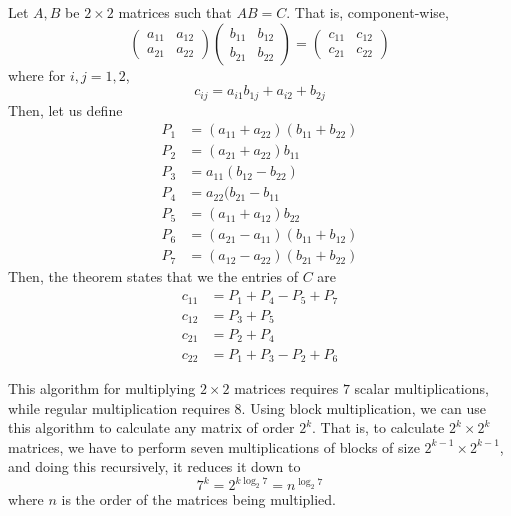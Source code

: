   \begin{theorem}
    Let $A, B$ be $2 \times 2$ matrices such that $AB = C$. That is, component-wise,
    \begin{equation}
      \begin{pmatrix}
      a_{11} & a_{12} \\ a_{21} & a_{22}
      \end{pmatrix} \begin{pmatrix}
      b_{11} & b_{12} \\ b_{21} & b_{22}
      \end{pmatrix}
       = \begin{pmatrix}
        c_{11} & c_{12} \\ c_{21} & c_{22}
       \end{pmatrix}
    \end{equation}
    where for $i, j = 1, 2$, 
    \begin{equation}
      c_{ij} = a_{i1} b_{1j} + a_{i2} + b_{2j}
    \end{equation}
    Then, let us define 
    \begin{align*}
      P_1 &= (a_{11} + a_{22}) (b_{11} + b_{22}) \\
      P_2 &= (a_{21} + a_{22}) b_{11} \\
      P_3 &= a_{11} (b_{12} - b_{22}) \\
      P_4 &= a_{22} (b_{21} - b_{11} \\
      P_5 &= (a_{11} + a_{12}) b_{22} \\
      P_6 &= (a_{21} - a_{11}) (b_{11} + b_{12}) \\
      P_7 &= (a_{12} - a_{22}) (b_{21} + b_{22}) 
    \end{align*}
    Then, the theorem states that we the entries of $C$ are 
    \begin{align*}
      c_{11} &= P_1 + P_4 - P_5 + P_7 \\
      c_{12} &= P_3 + P_5 \\
      c_{21} &= P_2 + P_4 \\
      c_{22} &= P_1 + P_3 - P_2 + P_6
    \end{align*}
  \end{theorem}

  This algorithm for multiplying $2\times 2$ matrices requires $7$ scalar multiplications, while regular multiplication requires $8$. Using block multiplication, we can use this algorithm to calculate any matrix of order $2^k$. That is, to calculate $2^k \times 2^k$ matrices, we have to perform seven multiplications of blocks of size $2^{k-1} \times 2^{k-1}$, and doing this recursively, it reduces it down to 
  \begin{equation}
    7^k = 2^{k \log_2{7}} = n^{\log_2{7}}
  \end{equation}
  where $n$ is the order of the matrices being multiplied. 

